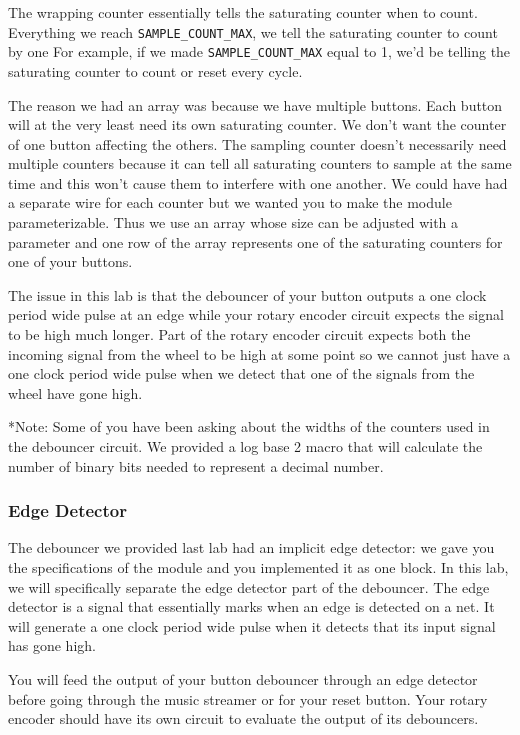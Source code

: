 \documentclass[11pt]{article}
\begin{document}
The wrapping counter essentially tells the saturating counter when to count. Everything we reach \verb|SAMPLE_COUNT_MAX|, we tell the saturating counter to count by one For example, if we made \verb|SAMPLE_COUNT_MAX| equal to 1, we'd be telling the saturating counter to count or reset every cycle. 

The reason we had an array was because we have multiple buttons. Each button will at the very least need its own saturating counter. We don't want the counter of one button affecting the others. The sampling counter doesn't necessarily need multiple counters because it can tell all saturating counters to sample at the same time and this won't cause them to interfere with one another. We could have had a separate wire for each counter but we wanted you to make the module parameterizable. Thus we use an array whose size can be adjusted with a parameter and one row of the array represents one of the saturating counters for one of your buttons. 

The issue in this lab is that the debouncer of your button outputs a one clock period wide pulse at an edge while your rotary encoder circuit expects the signal to be high much longer. Part of the rotary encoder circuit expects both the incoming signal from the wheel to be high at some point so we cannot just have a one clock period wide pulse when we detect that one of the signals from the wheel have gone high.

*Note: Some of you have been asking about the widths of the counters used in the debouncer circuit. We provided a log base 2 macro that will calculate the number of binary bits needed to represent a decimal number. 

\subsubsection{Edge Detector}

The debouncer we provided last lab had an implicit edge detector: we gave you the specifications of the module and you implemented it as one block. In this lab, we will specifically separate the edge detector part of the debouncer. The edge detector is a signal that essentially marks when an edge is detected on a net. It will generate a one clock period wide pulse when it detects that its input signal has gone high.

You will feed the output of your button debouncer through an edge detector before going through the music streamer or for your reset button. Your rotary encoder should have its own circuit to evaluate the output of its debouncers. 
\end{document}
